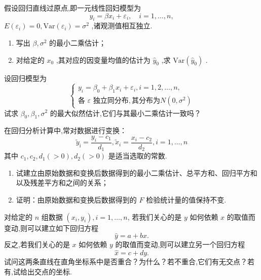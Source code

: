 \begin{xiti}
    \item 假设回归直线过原点,即一元线性回妇模型为 
    \begin{equation*}
    y_i=\beta x_i+\varepsilon_i,\quad i=1,\ldots ,n,
    \end{equation*}
 $E(\varepsilon_i)=0, \mathrm{Var}(\varepsilon_i)=\sigma^2$ ,诸观测值相互独立.
    \begin{enumerate}
        \item 写出 $\beta,\sigma^2$ 的最小二乘估计；
        \item 对给定的 $x_0$ ,其对应的因变量均值的估计为 $\hat{y}_0$ ,求 $\mathrm{Var}(\hat{y}_0)$ .
    \end{enumerate}
    \item 设回归模型为
    \begin{equation*}
      \begin{cases}
        y_i=\beta _0+\beta _1x_i+\varepsilon _i,i=1,2,\ldots ,n,\\
    \text{各 $\varepsilon$ 独立同分布}, \text{其分布为} N(0,\sigma^2)
      \end{cases}
    \end{equation*}
    试求 $\beta_0,\beta_1,\sigma^2$ 的最大似然估计,它们与其最小二乘估计一致吗？
    \item 在回归分析计算中,常对数据进行变换：
    \begin{equation*}
    \tilde{y}_{\mathrm{i}}=\frac{y_{i}-c_{1}}{d_{1}}, \tilde{x}_{i}=\frac{x_{i}-c_{2}}{d_{2}}, i=1, \ldots, n
    \end{equation*}
    其中 $c_1,c_2,d_1(>0),d_2(>0)$ 是适当选取的常数.
    \begin{enumerate}
        \item 试建立由原始数据和变换后数据得到的最小二乘估计、总平方和、回归平方和以及残差平方和之间的关系；
        \item 证明：由原始数据和变换后数据得到的 $F$ 检验统计量的值保持不变.
    \end{enumerate}
    \item 对给定的 $n$ 组数据 $(x_{i}, y_{i}),i=1,\ldots,n$, 若我们关心的是 $y$ 如何依赖 $x$ 的取值而变动,则可以建立如下回归方程\begin{equation*}
    \hat{y}=a+bx.
    \end{equation*}
    反之,若我们关心的是 $x$ 如何依赖 $y$ 的取值而变动,则可以建立另一个回归方程
    \begin{equation*}
    \hat{x}=c+dy.
    \end{equation*}
    试问这两条直线在直角坐标系中是否重合？为什么？若不重合,它们有无交点？若有,试给出交点的坐标.

\end{xiti}
